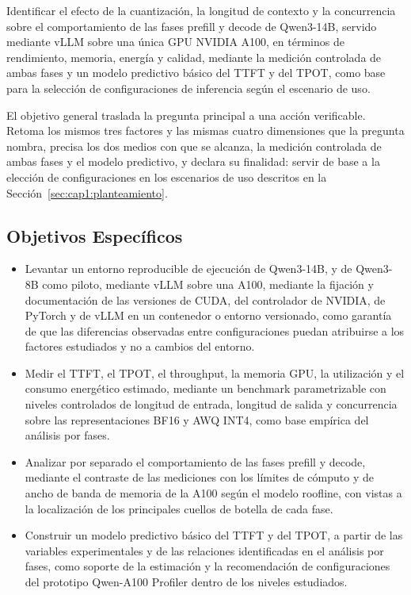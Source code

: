 Identificar el efecto de la cuantización, la longitud de contexto y la concurrencia sobre el comportamiento de las fases prefill y decode de Qwen3-14B, servido mediante vLLM sobre una única GPU NVIDIA A100, en términos de rendimiento, memoria, energía y calidad, mediante la medición controlada de ambas fases y un modelo predictivo básico del TTFT y del TPOT, como base para la selección de configuraciones de inferencia según el escenario de uso.

El objetivo general traslada la pregunta principal a una acción verificable. Retoma los mismos tres factores y las mismas cuatro dimensiones que la pregunta nombra, precisa los dos medios con que se alcanza, la medición controlada de ambas fases y el modelo predictivo, y declara su finalidad: servir de base a la elección de configuraciones en los escenarios de uso descritos en la Sección~\ref{sec:cap1:planteamiento}.

\subsection{Objetivos Específicos}
\label{sec:cap1:objetivos-especificos}

{\setlength{\emergencystretch}{1em}%
\begin{itemize}
  \item[OE1.] Levantar un entorno reproducible de ejecución de Qwen3-14B, y de Qwen3-8B como piloto, mediante vLLM sobre una A100, mediante la fijación y documentación de las versiones de CUDA, del controlador de NVIDIA, de PyTorch y de vLLM en un contenedor o entorno versionado, como garantía de que las diferencias observadas entre configuraciones puedan atribuirse a los factores estudiados y no a cambios del entorno.
  \item[OE2.] Medir el TTFT, el TPOT, el throughput, la memoria GPU, la utilización y el consumo energético estimado, mediante un benchmark parametrizable con niveles controlados de longitud de entrada, longitud de salida y concurrencia sobre las representaciones BF16 y AWQ INT4, como base empírica del análisis por fases.
  \item[OE3.] Analizar por separado el comportamiento de las fases prefill y decode, mediante el contraste de las mediciones con los límites de cómputo y de ancho de banda de memoria de la A100 según el modelo roofline, con vistas a la localización de los principales cuellos de botella de cada fase.
  \item[OE4.] Construir un modelo predictivo básico del TTFT y del TPOT, a partir de las variables experimentales y de las relaciones identificadas en el análisis por fases, como soporte de la estimación y la recomendación de configuraciones del prototipo Qwen-A100 Profiler dentro de los niveles estudiados.
\end{itemize}}

